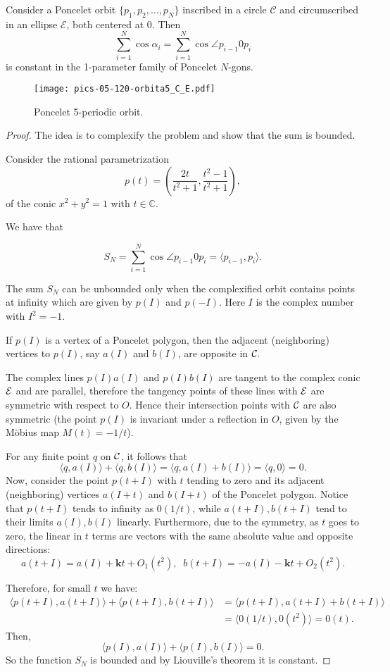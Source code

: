 \begin{theorem}
Consider a Poncelet orbit $\{p_1,p_2,\ldots, p_N\}$ inscribed in a circle $\mathcal{C}$ and circumscribed in an ellipse $
\mathcal{E}$, both centered at $0.$
Then 
\[\sum_{i=1}^N \cos \alpha_i= \sum_{i=1}^N \cos\angle p_{i-1}0p_{i}\] is constant in the 1-parameter family of Poncelet $N$-gons.
\label{th:somacossenos_liouville}
\end{theorem}
\begin{figure}
    \centering
    \texttt{[image: pics-05-120-orbita5\_C\_E.pdf]}
    \caption{Poncelet 5-periodic orbit.}
    \label{fig:orb5_poncelet}
\end{figure}
\begin{proof} The idea is to complexify the problem and show that the sum is bounded.  

Consider the rational parametrization 
\[ p(t)=\left(\frac{2t}{t^2+1},\frac{t^2-1}{t^2+1}\right),\] 
of the conic $x^2+y^2=1 $ with $t\in\mathbb{C}$.

We have that

\[S_N=\sum_{i=1}^N \cos\angle p_{i-1}0p_{i}=\langle p_{i-1}, p_i\rangle. \]

The sum $S_N$ can be unbounded only when the complexified orbit contains   points  at infinity which are given by $p(I)$ and $p(-I)$. Here $I$ is the complex number with $I^2=-1.$

 If $p(I)$ is a vertex of a Poncelet polygon, then the adjacent (neighboring) vertices to $p(I)$, say $a(I)$ and $b(I)$, are opposite in $\mathcal{C}.$

The complex lines $p(I)a(I)$ and $p(I)b(I)$ are tangent to the complex conic $\mathcal{E}$ and are parallel, therefore the tangency points of these lines with $\mathcal{E}$ are symmetric with respect to $O$. Hence their intersection points with $\mathcal{C}$ are also symmetric (the point $p(I)$ is invariant under a reflection in $O$, given by the Möbius map $M(t)=-1/t$).

  For any finite point $q$   on $\mathcal{C}$, it follows that
 \[ \langle  q, a(I)\rangle +\langle q, b(I)\rangle  =  \langle  q, a(I)+b(I)     \rangle=\langle q,0\rangle=
0.\]
 Now, consider the point $p(t +I)$ with $t$  tending to zero and its adjacent (neighboring) vertices
$a(I +t)$ and $ b(I +t)$ of the Poncelet polygon. Notice that $   p(t + I) $ tends to infinity as
$0(1/t)$, while $a(t + I), b(t + I)$ tend to their limits $a(I), b(I)$ linearly. Furthermore,
due to the symmetry, as $t$ goes to zero, the linear in $t$ terms are vectors with the same
absolute value and opposite directions:
\[a(t+I)=a(I)+\mathbf{k} t+O_1(t^2),\;\;b(t+I)=-a(I)-\mathbf{k} t+O_2(t^2).\]

\noindent Therefore, for small $t$ we have:
\begin{align*}
\langle p(t + I ), a(t + I )\rangle + \langle p(t + I ), b(t + I )\rangle & = \langle p(t + I ), a(t + I ) + b(t + I )\rangle\\
&= \langle 0(1/t),0(t^2)\rangle = 0(t).
\end{align*}
Then,
 \[ \langle  p(I), a(I)\rangle +\langle p(I), b(I)\rangle  =   
0.\]
So the function $S_N$ is bounded and by Liouville's theorem it is constant.
\end{proof}

